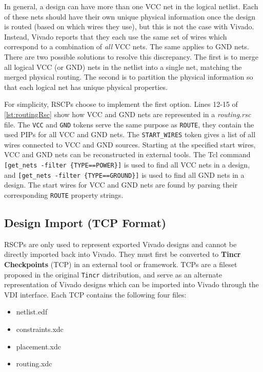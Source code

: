 In general, a design can have more than one VCC net in the logical netlist. Each
of these nets should have their own unique physical information once the
design is routed (based on which wires they use), but this is not the case with
Vivado. Instead, Vivado reports that they each use the same set of wires which
correspond to a combination of \textit{all} VCC nets. The same applies to GND
nets. There are two possible solutions to resolve this discrepancy. The first is
to merge all logical VCC (or GND) nets in the netlist into a single net, matching
the merged physical routing. The second is to partition the physical
information so that each logical net has unique physical properties. 

For simplicity, RSCPs choose to implement the first option. Lines 12-15 of
\autoref{lst:routingRsc} show how VCC and GND nets are represented in a
\textit{routing.rsc} file. The \texttt{VCC} and \texttt{GND} tokens serve the
same purpose as \texttt{ROUTE}, they contain the used PIPs for all VCC and GND
nets. The \texttt{START\_WIRES} token gives a list of all wires connected to
VCC and GND sources. Starting at the specified start wires, VCC and GND nets
can be reconstructed in external tools. The Tcl command \texttt{[get\_nets
-filter \{TYPE==POWER\}]} is used to find all VCC nets in a design, and
\texttt{[get\_nets -filter \{TYPE==GROUND\}]} is used to find all GND nets
in a design. The start wires for VCC and GND nets are found by parsing their
corresponding \texttt{ROUTE} property strings.

\subsection{Design Import (TCP Format)} \label{sec:vdiExport}

RSCPs are only used to represent exported Vivado designs and cannot be directly
imported back into Vivado. They must first be converted to \textbf{Tincr
Checkpoints} (TCP) in an external tool or framework. TCPs are a fileset proposed
in the original \texttt{Tincr} distribution, and serve as an alternate
representation of Vivado designs which can be imported into Vivado through the
VDI interface. Each TCP contains the following four files:

\begin{multicols}{2}
	\begin{itemize}
	  \item netlist.edf
	  \item constraints.xdc
	  \item placement.xdc
	  \item routing.xdc
	\end{itemize}
\end{multicols}

